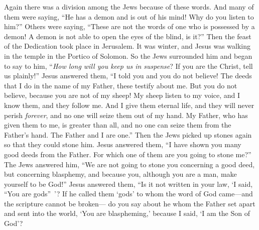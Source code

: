 \begin{biblechapter}
\verse Again there was a division among the Jews because of these words.
\verse And many of them were saying, “He has a demon and is out of his mind! Why do you listen to him?”
\verse Others were saying, “These are not the words of one who is possessed by a demon! A demon is not able to open the eyes of the blind, is it?”
 Then the feast of the Dedication took place in Jerusalem. It was winter,
\verse and Jesus was walking in the temple in the Portico of Solomon.
\verse So the Jews surrounded him and began to say to him, “\textit{How long will you keep us in suspense}? If you are the Christ, tell us plainly!”
\verse Jesus answered them, “I told you and you do not believe! The deeds that I do in the name of my Father, these testify about me.
\verse But you do not believe, because you are not of my sheep!
\verse My sheep listen to my voice, and I know them, and they follow me.
\verse And I give them eternal life, and they will never perish \textit{forever}, and no one will seize them out of my hand.
\verse My Father, who has given them to me, is greater than all, and no one can seize them from the Father’s hand.
\verse The Father and I are one.”
\verse Then the Jews picked up stones again so that they could stone him.
\verse Jesus answered them, “I have shown you many good deeds from the Father. For which one of them are you going to stone me?”
\verse The Jews answered him, “We are not going to stone you concerning a good deed, but concerning blasphemy, and because you, although you are a man, make yourself to be God!”
\verse Jesus answered them, “Is it not written in your law, ‘I said, “You are gods” ’?
\verse If he called them ‘gods’ to whom the word of God came—and the scripture cannot be broken—
\verse do you say about he whom the Father set apart and sent into the world, ‘You are blaspheming,’ because I said, ‘I am the Son of God’?

\end{biblechapter}
